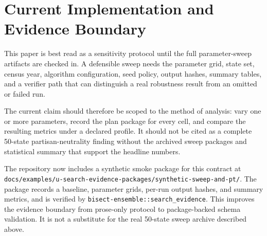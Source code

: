 \section{Current Implementation and Evidence Boundary}

This paper is best read as a sensitivity protocol until the full parameter-sweep
artifacts are checked in.  A defensible sweep needs the parameter grid, state
set, census year, algorithm configuration, seed policy, output hashes, summary
tables, and a verifier path that can distinguish a real robustness result from
an omitted or failed run.

The current claim should therefore be scoped to the method of analysis: vary one
or more parameters, record the plan package for every cell, and compare the
resulting metrics under a declared profile.  It should not be cited as a
complete 50-state partisan-neutrality finding without the archived sweep
packages and statistical summary that support the headline numbers.

The repository now includes a synthetic smoke package for this contract at
\texttt{docs/examples/u-search-evidence-packages/synthetic-sweep-and-pt/}.
The package records a baseline, parameter grids, per-run output hashes, and
summary metrics, and is verified by
\texttt{bisect-ensemble::search\_evidence}.  This improves the evidence
boundary from prose-only protocol to package-backed schema validation.  It is
not a substitute for the real 50-state sweep archive described above.
